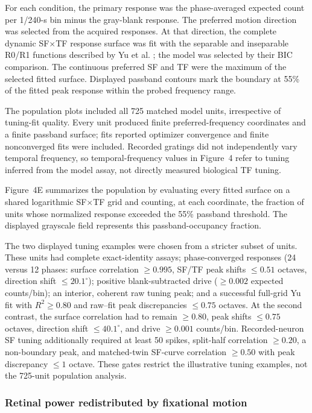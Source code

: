 \documentclass{lite}
\begin{document}
For each condition, the primary response was the phase-averaged expected count per 1/240-s bin minus the gray-blank response. The preferred motion direction was selected from the acquired responses. At that direction, the complete dynamic SF$\times$TF response surface was fit with the separable and inseparable R0/R1 functions described by Yu et al. \cite{yu2010spatial}; the model was selected by their BIC comparison. The continuous preferred SF and TF were the maximum of the selected fitted surface. Displayed passband contours mark the boundary at 55\% of the fitted peak response within the probed frequency range.

The population plots included all 725 matched model units, irrespective of tuning-fit quality. Every unit produced finite preferred-frequency coordinates and a finite passband surface; \FigFourConvergedFits{} fits reported optimizer convergence and \FigFourNonconvergedFits{} finite nonconverged fits were included. Recorded gratings did not independently vary temporal frequency, so temporal-frequency values in Figure~4 refer to tuning inferred from the model assay, not directly measured biological TF tuning.

Figure~4E summarizes the population by evaluating every fitted surface on a shared logarithmic SF$\times$TF grid and counting, at each coordinate, the fraction of units whose normalized response exceeded the 55\% passband threshold. The displayed grayscale field represents this passband-occupancy fraction.

The two displayed tuning examples were chosen from a stricter subset of \FigFourValidated{} units. These units had complete exact-identity assays; phase-converged responses (24 versus 12 phases: surface correlation $\geq0.995$, SF/TF peak shifts $\leq0.51$ octaves, direction shift $\leq20.1^\circ$); positive blank-subtracted drive ($\geq0.002$ expected counts/bin); an interior, coherent raw tuning peak; and a successful full-grid Yu fit with $R^2\geq0.80$ and raw--fit peak discrepancies $\leq0.75$ octaves. At the second contrast, the surface correlation had to remain $\geq0.80$, peak shifts $\leq0.75$ octaves, direction shift $\leq40.1^\circ$, and drive $\geq0.001$ counts/bin. Recorded-neuron SF tuning additionally required at least 50 spikes, split-half correlation $\geq0.20$, a non-boundary peak, and matched-twin SF-curve correlation $\geq0.50$ with peak discrepancy $\leq1$ octave. These gates restrict the illustrative tuning examples, not the 725-unit population analysis.

\subsubsection{Retinal power redistributed by fixational motion}
\end{document}
